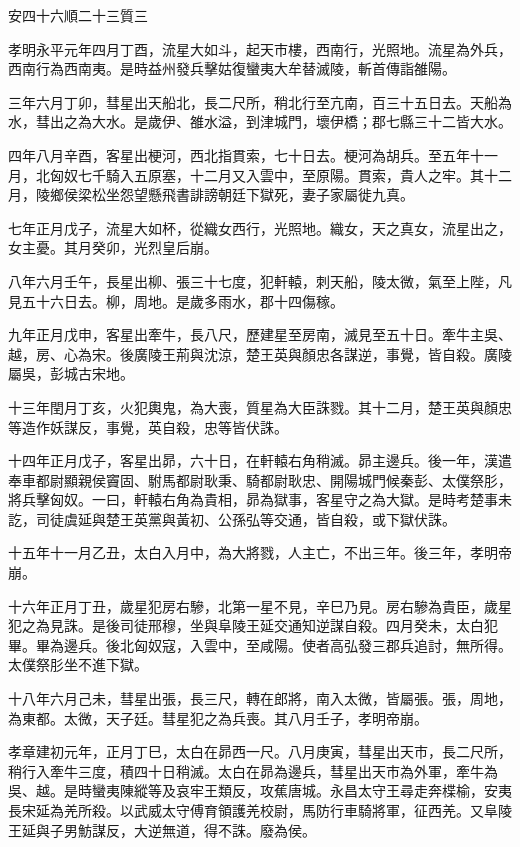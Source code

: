 
\begin{pinyinscope}
安四十六順二十三質三

孝明永平元年四月丁酉，流星大如斗，起天市樓，西南行，光照地。流星為外兵，西南行為西南夷。是時益州發兵擊姑復蠻夷大牟替滅陵，斬首傳詣雒陽。

三年六月丁卯，彗星出天船北，長二尺所，稍北行至亢南，百三十五日去。天船為水，彗出之為大水。是歲伊、雒水溢，到津城門，壞伊橋；郡七縣三十二皆大水。

四年八月辛酉，客星出梗河，西北指貫索，七十日去。梗河為胡兵。至五年十一月，北匈奴七千騎入五原塞，十二月又入雲中，至原陽。貫索，貴人之牢。其十二月，陵鄉侯梁松坐怨望懸飛書誹謗朝廷下獄死，妻子家屬徙九真。

七年正月戊子，流星大如杯，從織女西行，光照地。織女，天之真女，流星出之，女主憂。其月癸卯，光烈皇后崩。

八年六月壬午，長星出柳、張三十七度，犯軒轅，刺天船，陵太微，氣至上陛，凡見五十六日去。柳，周地。是歲多雨水，郡十四傷稼。

九年正月戊申，客星出牽牛，長八尺，歷建星至房南，滅見至五十日。牽牛主吳、越，房、心為宋。後廣陵王荊與沈涼，楚王英與顏忠各謀逆，事覺，皆自殺。廣陵屬吳，彭城古宋地。

十三年閏月丁亥，火犯輿鬼，為大喪，質星為大臣誅戮。其十二月，楚王英與顏忠等造作妖謀反，事覺，英自殺，忠等皆伏誅。

十四年正月戊子，客星出昴，六十日，在軒轅右角稍滅。昴主邊兵。後一年，漢遣奉車都尉顯親侯竇固、駙馬都尉耿秉、騎都尉耿忠、開陽城門候秦彭、太僕祭肜，將兵擊匈奴。一曰，軒轅右角為貴相，昴為獄事，客星守之為大獄。是時考楚事未訖，司徒虞延與楚王英黨與黃初、公孫弘等交通，皆自殺，或下獄伏誅。

十五年十一月乙丑，太白入月中，為大將戮，人主亡，不出三年。後三年，孝明帝崩。

十六年正月丁丑，歲星犯房右驂，北第一星不見，辛巳乃見。房右驂為貴臣，歲星犯之為見誅。是後司徒邢穆，坐與阜陵王延交通知逆謀自殺。四月癸未，太白犯畢。畢為邊兵。後北匈奴寇，入雲中，至咸陽。使者高弘發三郡兵追討，無所得。太僕祭肜坐不進下獄。

十八年六月己未，彗星出張，長三尺，轉在郎將，南入太微，皆屬張。張，周地，為東都。太微，天子廷。彗星犯之為兵喪。其八月壬子，孝明帝崩。

孝章建初元年，正月丁巳，太白在昴西一尺。八月庚寅，彗星出天市，長二尺所，稍行入牽牛三度，積四十日稍滅。太白在昴為邊兵，彗星出天市為外軍，牽牛為吳、越。是時蠻夷陳縱等及哀牢王類反，攻蕉唐城。永昌太守王尋走奔楪榆，安夷長宋延為羌所殺。以武威太守傅育領護羌校尉，馬防行車騎將軍，征西羌。又阜陵王延與子男魴謀反，大逆無道，得不誅。廢為侯。


\end{pinyinscope}
